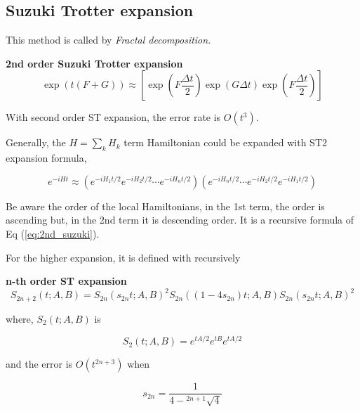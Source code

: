 \subsection{Suzuki Trotter expansion}

This method is called by \textit{Fractal decomposition}\cite{suzuki_finding_2005}.


\begin{theorem}\textbf{2nd order Suzuki Trotter expansion}
    \begin{equation}
        \label{eq:2nd_suzuki}
        \exp\left(t (F + G)\right) \approx [\exp(F \frac{\Delta t}{2}) \exp(G\Delta t) \exp(F \frac{\Delta t}{2})]
    \end{equation}
\end{theorem}

With second order ST expansion, the error rate is $O(t^3)$.

Generally, the $H = \sum_k H_k$ term Hamiltonian could be expanded with ST2 expansion formula,

\begin{equation}
    e^{-i H t} \approx \left( e^{-i H_1 t/2} e^{-i H_2 t/2} \cdots e^{-i H_n t/2} \right)\left(e^{-i H_n t/2} \cdots e^{-i H_2 t/2} e^{-i H_1 t/2} \right)
\end{equation}

Be aware the order of the local Hamiltonians, in the 1st term, the order is ascending but, in the 2nd term
it is descending order. It is a recursive formula of Eq (\ref{eq:2nd_suzuki}).

For the higher expansion, it is defined with recursively

\begin{theorem} \textbf{n-th order ST expansion}
    \label{theorem:n_ST}
    \begin{equation}
        S_{2n+2}(t; A, B) = S_{2n}(s_{2n} t; A, B)^2 S_{2n}((1-4s_{2n}) t; A, B) S_{2n}(s_{2n} t; A, B)^2 
    \end{equation}

    where, $S_2(t; A, B)$ is 

    \begin{equation}
        S_2(t; A, B) = e^{t A/2} e^{t B} e^{t A/2}
    \end{equation}

    and the error is $O(t^{2n+3})$ when 

    \begin{equation}
        s_{2n} = \frac{1}{4 - {}^{2n+1}\sqrt{4}}
    \end{equation}
\end{theorem}

